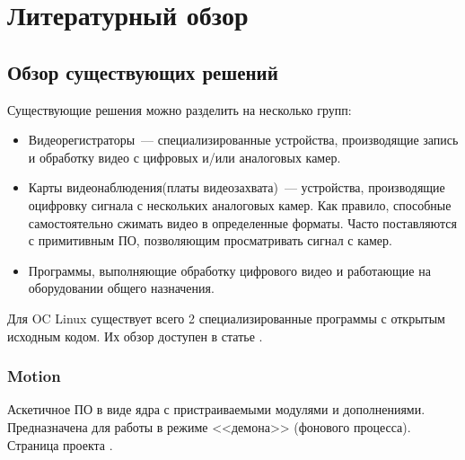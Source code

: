 \chapter{Литературный обзор}
\section{Обзор существующих решений}

Существующие решения можно разделить на несколько групп:
\smallskip
\begin{itemize}
	\item
	Видеорегистраторы~--- специализированные устройства,
	производящие запись и обработку видео с цифровых и/или аналоговых камер.
	\item
	Карты видеонаблюдения(платы видеозахвата)~--- устройства, производящие оцифровку
	сигнала с нескольких аналоговых камер. Как правило, способные самостоятельно сжимать
	видео в определенные форматы. Часто поставляются с примитивным ПО, позволяющим
	просматривать сигнал с камер.
	\item
	Программы, выполняющие обработку цифрового видео и работающие на оборудовании общего
	назначения.
\end{itemize}

\medskip

Для OC Linux существует всего 2 специализированные программы с открытым исходным кодом.
Их обзор доступен в статье \cite{motion_zm_review}.

\subsection{Motion}

Аскетичное ПО в виде ядра с пристраиваемыми модулями и дополнениями.
Предназначена для работы в режиме <<демона>> (фонового процесса).
Страница проекта \cite{motion_about}.

\medskip

